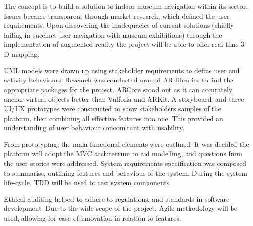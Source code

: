 
{
The concept is to build a solution to indoor museum navigation within its sector. Issues became transparent through market research, which defined the user requirements. Upon discovering the inadequacies of current solutions (chiefly failing in succinct user navigation with museum exhibitions) through the implementation of augmented reality the project will be able to offer real-time 3-D mapping.

UML models were drawn up using stakeholder requirements to define user and activity behaviours. Research was conducted around AR libraries to find the appropriate packages for the project. ARCore stood out as it can accurately anchor virtual objects better than Vulforia and ARKit. A storyboard, and three UI/UX prototypes were constructed to show stakeholders samples of the platform, then combining all effective features into one. This provided an understanding of user behaviour concomitant with usability.

From prototyping, the main functional elements were outlined. It was decided the platform will adopt the MVC architecture to aid modelling, and questions from the user stories were addressed. System requirements specification was composed to summarise, outlining features and behaviour of the system. During the system life-cycle, TDD will be used to test system components.

Ethical auditing helped to adhere to regulations, and standards in software development. Due to the wide scope of the project, Agile methodology will be used, allowing for ease of innovation in relation to features.

}